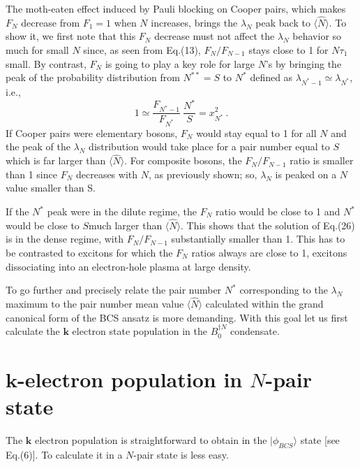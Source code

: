 \documentclass[twocolumn,showpacs]{revtex4}
\def\v#1{\mathbf{#1}}
\begin{document}
The moth-eaten effect induced by Pauli blocking on Cooper pairs, which makes $F_N$ decrease from $F_1=1$ when $N$ increases,  brings the $\lambda_N$ peak back to $\langle\hat{N}\rangle$.  To show it, we first note that this $F_N$ decrease must not affect the $\lambda_N$ behavior so much for small $N$ since, as seen from Eq.(13), $F_N/F_{N-1}$ stays close to 1 for $N\tau_1$ small. By contrast, $F_N$ is going to play a key role for large $N$'s by bringing the peak of the probability distribution from $N^{\ast\ast}=S$ to $N^\ast$ defined as
$\lambda_{N^\ast-1}\simeq \lambda_{N^\ast}$, i.e.,
\begin{equation}\label{xn}
1\simeq\frac{F_{N^\ast-1}}{F_{N^\ast}}\ \frac{N^\ast}{S}=x_{N^\ast}^2\ .
\end{equation}
If Cooper pairs were elementary bosons, $F_N$ would stay equal to 1 for all $N$ and the peak of the $\lambda_N$ distribution would take place for a pair number equal to $S$ which is far larger than  $\langle\hat{N}\rangle$. For composite bosons, the $F_N/F_{N-1}$ ratio is smaller than 1 since $F_N$ decreases with $N$, as previously shown; so, $\lambda_N$ is peaked on a $N$ value smaller than S.

If the $N^\ast$ peak were in the dilute regime, the $F_N$ ratio would be close to 1 and $N^\ast$ would be close to $S$much larger than $\langle\hat{N}\rangle$. This shows that the solution of Eq.(26) is in the dense regime, with $F_N/F_{N-1}$ substantially smaller than 1. This has to be contrasted to excitons for which the $F_N$ ratios always are close to 1, excitons dissociating into an electron-hole plasma at large density.

To go further and precisely relate the pair number $N^*$ corresponding to the $\lambda_N$ maximum to the pair number mean value  $\langle\hat{N}\rangle$ calculated within the grand canonical  form of the BCS ansatz is more demanding. With this goal let us first calculate the $\v k$ electron state population in the $B_0^{\dag N}$ condensate.

\section{$\v k$-electron population in $N$-pair state}

The $\v k$ electron population is straightforward to obtain in the $|\phi_{BCS}\rangle$ state [see Eq.(6)]. To calculate it in a $N$-pair state is less easy.
\end{document}
